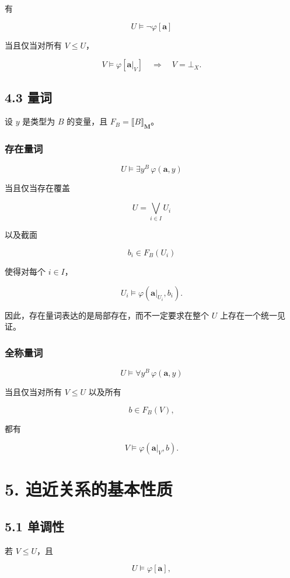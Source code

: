 \documentclass{ctexart}
\begin{document}
有

\[
U\models\neg\varphi[\mathbf a]
\]

当且仅当对所有 $V\le U$，

\[
V\models\varphi[\mathbf a|_V]
\quad\Longrightarrow\quad
V=\bot_X.
\]

\subsection*{4.3 量词}

设 $y$ 是类型为 $B$ 的变量，且 $F_B=\llbracket B\rrbracket_{\mathbf M}$。

\subsubsection*{存在量词}

\[
U\models\exists y^B\,\varphi(\mathbf a,y)
\]

当且仅当存在覆盖

\[
U=\bigvee_{i\in I}U_i
\]

以及截面

\[
b_i\in F_B(U_i)
\]

使得对每个 $i\in I$，

\[
U_i\models
\varphi(\mathbf a|_{U_i},b_i).
\]

因此，存在量词表达的是局部存在，而不一定要求在整个 $U$ 上存在一个统一见证。

\subsubsection*{全称量词}

\[
U\models\forall y^B\,\varphi(\mathbf a,y)
\]

当且仅当对所有 $V\le U$ 以及所有

\[
b\in F_B(V),
\]

都有

\[
V\models\varphi(\mathbf a|_V,b).
\]

\section*{5. 迫近关系的基本性质}

\subsection*{5.1 单调性}

若 $V\le U$，且

\[
U\models\varphi[\mathbf a],
\]
\end{document}

